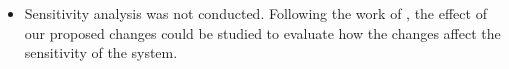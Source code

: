  \label{chap:conclussion}



\begin{itemize}
    \item
        Sensitivity analysis was not conducted.
        Following the work of \citet{Lawrence1994},
        the effect of our proposed changes could be studied
        to evaluate how the changes affect the sensitivity of the system.
\end{itemize}
